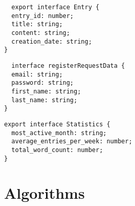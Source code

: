 \begin{verbatim}
  export interface Entry {
  entry_id: number;
  title: string;
  content: string;
  creation_date: string;
}
\end{verbatim}
\begin{verbatim}
  interface registerRequestData {
  email: string;
  password: string;
  first_name: string;
  last_name: string;
}
\end{verbatim}

\begin{verbatim}
export interface Statistics {
  most_active_month: string;
  average_entries_per_week: number;
  total_word_count: number;
}
\end{verbatim}



\section{Algorithms}

